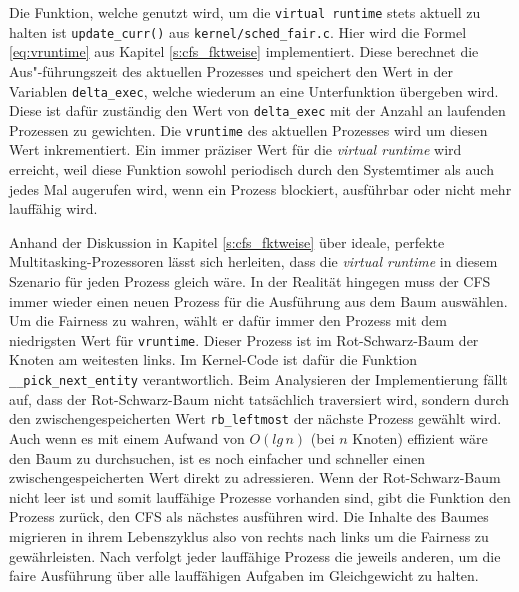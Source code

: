 Die Funktion, welche genutzt wird, um die  \texttt{virtual \- runtime} stets aktuell zu halten ist \texttt{update\_curr()} aus \texttt{kernel/sched\_fair.c}. Hier wird die Formel \ref{eq:vruntime} aus Kapitel \ref{s:cfs_fktweise} implementiert. Diese berechnet die Aus"-führungszeit des aktuellen Prozesses und speichert den Wert in der Variablen \texttt{delta\_exec}, welche wiederum an eine Unterfunktion über\-geben wird. Diese ist dafür zuständig den Wert von \texttt{delta\-\_exec} mit der Anzahl an laufenden Prozessen zu gewichten. Die \texttt{vruntime} des aktuellen Prozesses wird um diesen Wert inkrementiert.  Ein immer präziser Wert für die \textit{virtual runtime} wird erreicht, weil diese Funktion sowohl periodisch durch den Systemtimer als auch jedes Mal augerufen wird, wenn ein Prozess blockiert, ausführbar oder nicht mehr lauffähig wird. 

Anhand der Diskussion in Kapitel \ref{s:cfs_fktweise} über ideale, perfekte Multitasking-Prozessoren lässt sich herleiten, dass die \textit{virtual runtime} in diesem Szenario für jeden Prozess gleich wäre. In der Realität hingegen muss der CFS immer wieder einen neuen Prozess für die Ausführung aus dem Baum auswählen. Um die Fairness zu wahren, wählt er dafür immer den Prozess mit dem niedrigsten Wert für \texttt{vruntime}. Dieser Prozess ist im Rot-Schwarz-Baum der Knoten am weitesten links. Im Kernel-Code ist dafür die Funktion \texttt{\_\_pick\_next\_entity} verantwortlich. Beim \- Analysieren der Implementierung fällt auf, dass der Rot-Schwarz-Baum nicht tatsächlich traversiert wird, sondern durch den zwischengespeicherten Wert \texttt{rb\_leftmost} der nächste Prozess gewählt wird. Auch wenn es mit einem Aufwand von $O(lg\, n)$ (bei $n$ Knoten) effizient wäre den Baum zu durchsuchen, ist es noch einfacher und schneller einen zwischengespeicherten Wert direkt zu adressieren. Wenn der Rot-Schwarz-Baum nicht leer ist und somit lauffähige Prozesse vorhanden sind, gibt die Funktion den Prozess zurück, den CFS als nächstes ausführen wird. Die Inhalte des Baumes migrieren in ihrem Lebenszyklus also von rechts nach links um die Fairness zu gewährleisten. Nach \cite{mjones} verfolgt jeder lauffähige Prozess die jeweils anderen, um die faire Ausführung über alle lauffähigen Aufgaben im Gleichgewicht zu halten.

